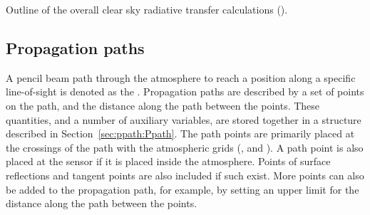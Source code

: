 \begin{algorithm}[!t]
 \begin{algorithmic}
   \ENDFOR
  \ENDFOR
 \end{algorithmic}
 \caption{Outline of the overall clear sky radiative transfer calculations
   ().}
 \label{alg:fm_defs:RteCalc}
\end{algorithm}


\subsection{Propagation paths}
\label{sec:fm_defs:ppaths}

A pencil beam path through the atmosphere to reach a position along a
specific line-of-sight is denoted as the .
Propagation paths are described by a set of points on the path, and
the distance along the path between the points. These quantities, and
a number of auxiliary variables, are stored together in a structure
described in Section~\ref{sec:ppath:Ppath}. The path points are
primarily placed at the crossings of the path with the atmospheric
grids (,  and
). A path point is also placed at the sensor if
it is placed inside the atmosphere.  Points of surface reflections and
tangent points are also included if such exist. More points can also
be added to the propagation path, for example, by setting an upper
limit for the distance along the path between the points.

